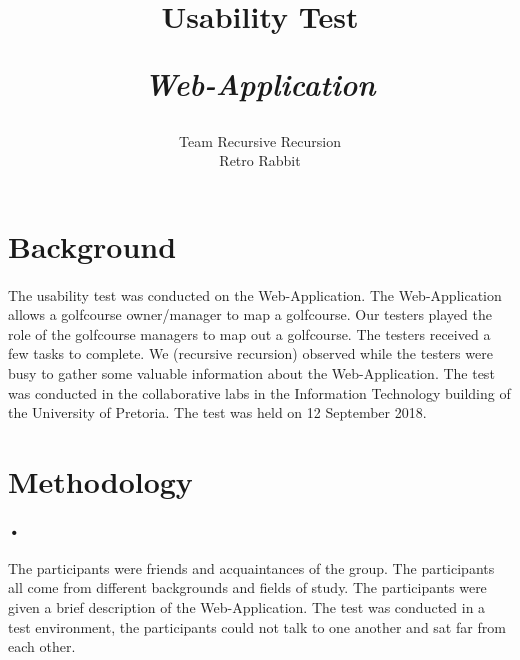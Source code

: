 \documentclass{article}
\title{
    Usability Test\\
    \begin{large}
      \textit{Web-Application}
    \end{large}
}
\date{
    \begin{small}
        \today
    \end{small}
}
\author{
    Team Recursive Recursion \\
    Retro Rabbit
}
\begin{document}
    \maketitle
    \newpage


    
    \tableofcontents
    \newpage
	\section{Background}    
	\paragraph{}
	The usability test was conducted on the Web-Application. The Web-Application allows a golfcourse owner/manager to map a golfcourse. Our testers played the role of the golfcourse managers to map out a golfcourse. The testers received a few tasks to complete. We (recursive recursion) observed while the testers were busy to gather some valuable information about the Web-Application. The test was conducted in the collaborative labs in the Information Technology building of the University of Pretoria. The test was held on 12 September 2018.


	\section{Methodology}
	\paragraph{•}
	  The participants were friends and acquaintances of the group. The participants all come from different backgrounds and fields of study. The participants were given a brief description of the Web-Application. The test was conducted in a test environment, the participants could not talk to one another and sat far from each other.
	  
\end{document}
